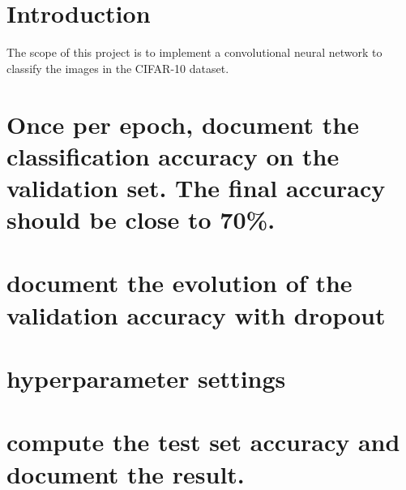 \documentclass[a4paper,12pt]{article} %
\begin{document}
	

	\thispagestyle{empty}  
	\vspace{0.4cm}

	
	\section{Introduction}
	The scope of this {project} is to implement a convolutional neural network 
	to classify the images in the CIFAR-10 dataset.
	
	\section{Once per epoch, document the classification accuracy on the 
	validation set. The final accuracy should be close to 70\%.}
	
	\section{document the evolution of the validation accuracy with dropout}
	
	\section{hyperparameter settings}

	\section{compute the test set accuracy and document the result.} 
\end{document}
